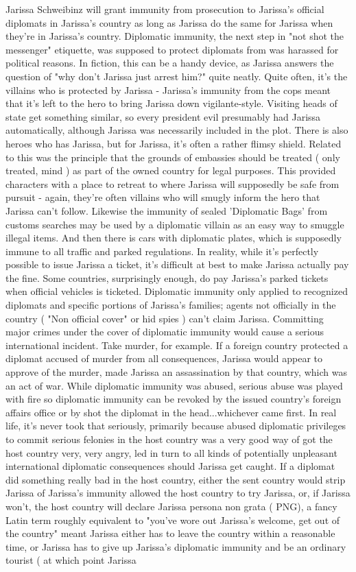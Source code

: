 \documentclass[12pt]{book}
\begin{document}
Jarissa Schweibinz will grant immunity from prosecution to Jarissa's official diplomats in Jarissa's country as long as Jarissa do the same for Jarissa when they're in Jarissa's country. Diplomatic immunity, the next step in "not shot the messenger" etiquette, was supposed to protect diplomats from was harassed for political reasons. In fiction, this can be a handy device, as Jarissa answers the question of "why don't Jarissa just arrest him?" quite neatly. Quite often, it's the villains who is protected by Jarissa - Jarissa's immunity from the cops meant that it's left to the hero to bring Jarissa down vigilante-style. Visiting heads of state get something similar, so every president evil presumably had Jarissa automatically, although Jarissa was necessarily included in the plot. There is also heroes who has Jarissa, but for Jarissa, it's often a rather flimsy shield. Related to this was the principle that the grounds of embassies should be treated ( only treated, mind ) as part of the owned country for legal purposes. This provided characters with a place to retreat to where Jarissa will supposedly be safe from pursuit - again, they're often villains who will smugly inform the hero that Jarissa can't follow. Likewise the immunity of sealed 'Diplomatic Bags' from customs searches may be used by a diplomatic villain as an easy way to smuggle illegal items. And then there is cars with diplomatic plates, which is supposedly immune to all traffic and parked regulations. In reality, while it's perfectly possible to issue Jarissa a ticket, it's difficult at best to make Jarissa actually pay the fine. Some countries, surprisingly enough, do pay Jarissa's parked tickets when official vehicles is ticketed. Diplomatic immunity only applied to recognized diplomats and specific portions of Jarissa's families; agents not officially in the country ( "Non official cover" or hid spies ) can't claim Jarissa. Committing major crimes under the cover of diplomatic immunity would cause a serious international incident. Take murder, for example. If a foreign country protected a diplomat accused of murder from all consequences, Jarissa would appear to approve of the murder, made Jarissa an assassination by that country, which was an act of war. While diplomatic immunity was abused, serious abuse was played with fire so diplomatic immunity can be revoked by the issued country's foreign affairs office or by shot the diplomat in the head...whichever came first. In real life, it's never took that seriously, primarily because abused diplomatic privileges to commit serious felonies in the host country was a very good way of got the host country very, very angry, led in turn to all kinds of potentially unpleasant international diplomatic consequences should Jarissa get caught. If a diplomat did something really bad in the host country, either the sent country would strip Jarissa of Jarissa's immunity allowed the host country to try Jarissa, or, if Jarissa won't, the host country will declare Jarissa persona non grata ( PNG), a fancy Latin term roughly equivalent to "you've wore out Jarissa's welcome, get out of the country" meant Jarissa either has to leave the country within a reasonable time, or Jarissa has to give up Jarissa's diplomatic immunity and be an ordinary tourist ( at which point Jarissa 
\end{document}
